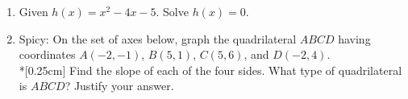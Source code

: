 \documentclass[12pt, twoside]{article}
\begin{document}
\begin{enumerate}
\newpage
\item Given $h(x)=x^2-4x-5$. Solve $h(x)=0$. \vspace{5cm}

  \item Spicy: On the set of axes below, graph the quadrilateral $ABCD$ having coordinates $A(-2,-1)$, $B(5,1)$, $C(5,6)$, and $D(-2,4)$. \\*[0.25cm]
  Find the slope of each of the four sides. What type of quadrilateral is $ABCD$? Justify your answer.
  \begin{flushright} %
  \end{flushright}



  \end{enumerate}

  
\end{document}
